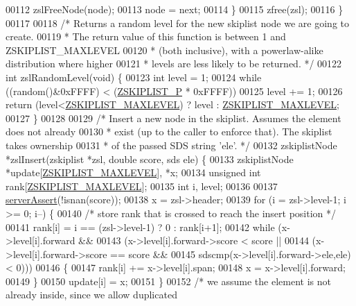 \begin{DoxyCode}
00112         zslFreeNode(node);
00113         node = next;
00114     \}
00115     zfree(zsl);
00116 \}
00117 
00118 \textcolor{comment}{/* Returns a random level for the new skiplist node we are going to create.}
00119 \textcolor{comment}{ * The return value of this function is between 1 and ZSKIPLIST\_MAXLEVEL}
00120 \textcolor{comment}{ * (both inclusive), with a powerlaw-alike distribution where higher}
00121 \textcolor{comment}{ * levels are less likely to be returned. */}
00122 \textcolor{keywordtype}{int} zslRandomLevel(\textcolor{keywordtype}{void}) \{
00123     \textcolor{keywordtype}{int} level = 1;
00124     \textcolor{keywordflow}{while} ((random()&0xFFFF) < (\hyperlink{server_8h_a6cb1a940e657f4a54397ed1f580fdccc}{ZSKIPLIST\_P} * 0xFFFF))
00125         level += 1;
00126     \textcolor{keywordflow}{return} (level<\hyperlink{server_8h_a36822e3ce2740c64859068fd849e227b}{ZSKIPLIST\_MAXLEVEL}) ? level : 
      \hyperlink{server_8h_a36822e3ce2740c64859068fd849e227b}{ZSKIPLIST\_MAXLEVEL};
00127 \}
00128 
00129 \textcolor{comment}{/* Insert a new node in the skiplist. Assumes the element does not already}
00130 \textcolor{comment}{ * exist (up to the caller to enforce that). The skiplist takes ownership}
00131 \textcolor{comment}{ * of the passed SDS string 'ele'. */}
00132 zskiplistNode *zslInsert(zskiplist *zsl, \textcolor{keywordtype}{double} score, sds ele) \{
00133     zskiplistNode *update[\hyperlink{server_8h_a36822e3ce2740c64859068fd849e227b}{ZSKIPLIST\_MAXLEVEL}], *x;
00134     \textcolor{keywordtype}{unsigned} \textcolor{keywordtype}{int} rank[\hyperlink{server_8h_a36822e3ce2740c64859068fd849e227b}{ZSKIPLIST\_MAXLEVEL}];
00135     \textcolor{keywordtype}{int} i, level;
00136 
00137     \hyperlink{server_8h_a88114b5169b4c382df6b56506285e56a}{serverAssert}(!isnan(score));
00138     x = zsl->header;
00139     \textcolor{keywordflow}{for} (i = zsl->level-1; i >= 0; i--) \{
00140         \textcolor{comment}{/* store rank that is crossed to reach the insert position */}
00141         rank[i] = i == (zsl->level-1) ? 0 : rank[i+1];
00142         \textcolor{keywordflow}{while} (x->level[i].forward &&
00143                 (x->level[i].forward->score < score ||
00144                     (x->level[i].forward->score == score &&
00145                     sdscmp(x->level[i].forward->ele,ele) < 0)))
00146         \{
00147             rank[i] += x->level[i].span;
00148             x = x->level[i].forward;
00149         \}
00150         update[i] = x;
00151     \}
00152     \textcolor{comment}{/* we assume the element is not already inside, since we allow duplicated}

\end{DoxyCode}
